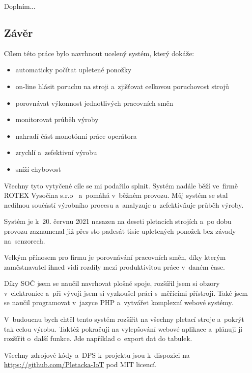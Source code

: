 \documentclass[12pt, a4paper]{article}
\begin{document}
Doplním...






\subsection*{Závěr}

Cílem této práce bylo navrhnout ucelený systém, který dokáže:

\begin{itemize}
    \item automaticky počítat upletené ponožky
    \item on-line hlásit poruchu na stroji a~zjišťovat celkovou poruchovost strojů
    \item porovnávat výkonnost jednotlivých pracovních směn
    \item monitorovat průběh výroby
    \item nahradí část monotónní práce operátora
    \item zrychlí a~zefektivní výrobu
    \item sníží chybovost
\end{itemize}

Všechny tyto vytyčené cíle se mi podařilo splnit. Systém nadále běží ve~firmě ROTEX Vysočina s.r.o~\cite{ROTEX} a~pomáhá v~běžném provozu.
Můj systém se stal nedílnou součástí výrobního procesu a analyzuje a~zefektivňuje průběh výroby.

Systém je k 20. červnu 2021 nasazen na deseti pletacích strojích a po dobu provozu zaznamenal již přes sto padesát tisíc upletených ponožek bez závady na~senzorech.

Velkým přínosem pro firmu je porovnávání pracovních směn, díky kterým zaměstnavatel ihned vidí rozdíly mezi produktivitou práce v~daném čase.

Díky SOČ jsem se naučil navrhovat plošné spoje, rozšířil jsem si obzory v~elektronice a~při vývoji jsem si vyzkoušel práci s~měřícími přístroji. 
Také jsem se naučil programovat v~jazyce PHP a~vytvářet komplexní webové systémy.

V~budoucnu bych chtěl tento systém rozšířit na všechny pletací stroje a~pokrýt tak celou výrobu.
Taktéž pokračuji na vylepšování webové aplikace a~plánuji ji rozšířit o~další funkce.
Jde například o~export dat do tabulek.

Všechny zdrojové kódy a~DPS k~projektu jsou k~dispozici na \url{https://github.com/Pletacka-IoT} pod MIT licencí.

\newpage





\appendix



\end{document}
